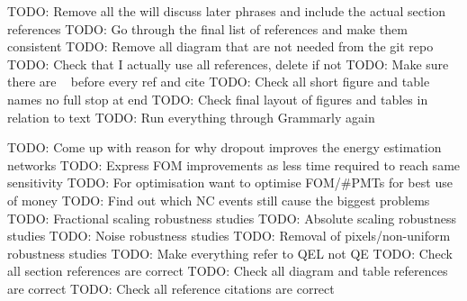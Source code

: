 TODO: Remove all the will discuss later phrases and include the actual section references
TODO: Go through the final list of references and make them consistent
TODO: Remove all diagram that are not needed from the git repo
TODO: Check that I actually use all references, delete if not
TODO: Make sure there are ~ before every ref and cite
TODO: Check all short figure and table names no full stop at end
TODO: Check final layout of figures and tables in relation to text
TODO: Run everything through Grammarly again

TODO: Come up with reason for why dropout improves the energy estimation networks
TODO: Express FOM improvements as less time required to reach same sensitivity
TODO: For optimisation want to optimise FOM/#PMTs for best use of money
TODO: Find out which NC events still cause the biggest problems
TODO: Fractional scaling robustness studies
TODO: Absolute scaling robustness studies
TODO: Noise robustness studies
TODO: Removal of pixels/non-uniform robustness studies
TODO: Make everything refer to QEL not QE
TODO: Check all section references are correct
TODO: Check all diagram and table references are correct
TODO: Check all reference citations are correct